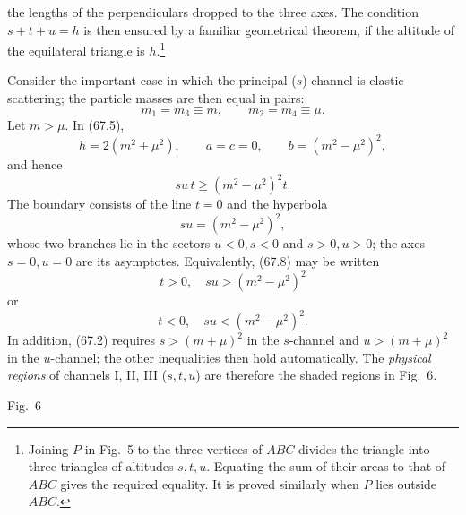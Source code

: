 the lengths of the perpendiculars dropped to the three axes. The condition $s+t+u=h$ is then ensured by a familiar geometrical theorem, if the altitude of the equilateral triangle is $h$.\footnote{Joining $P$ in Fig.~5 to the three vertices of $ABC$ divides the triangle into three triangles of altitudes $s,t,u$. Equating the sum of their areas to that of $ABC$ gives the required equality. It is proved similarly when $P$ lies outside $ABC$.}

Consider the important case in which the principal ($s$) channel is elastic scattering; the particle masses are then equal in pairs:
\begin{equation}
m_1=m_3\equiv m,\qquad m_2=m_4\equiv\mu.
\tag{67.7}
\end{equation}
Let $m>\mu$. In (67.5),
\[
h=2(m^2+\mu^2),\qquad a=c=0,\qquad b=(m^2-\mu^2)^2,
\]
and hence
\begin{equation}
su\,t\geqslant(m^2-\mu^2)^2t.
\tag{67.8}
\end{equation}
The boundary consists of the line $t=0$ and the hyperbola
\begin{equation}
su=(m^2-\mu^2)^2,
\tag{67.9}
\end{equation}
whose two branches lie in the sectors $u<0,s<0$ and $s>0,u>0$; the axes $s=0,u=0$ are its asymptotes. Equivalently, (67.8) may be written
\[
t>0,\quad su>(m^2-\mu^2)^2
\]
or
\[
t<0,\quad su<(m^2-\mu^2)^2.
\]
In addition, (67.2) requires $s>(m+\mu)^2$ in the $s$-channel and $u>(m+\mu)^2$ in the $u$-channel; the other inequalities then hold automatically. The \emph{physical regions} of channels I, II, III ($s,t,u$) are therefore the shaded regions in Fig.~6.

\begin{center}

Fig.~6
\end{center}

